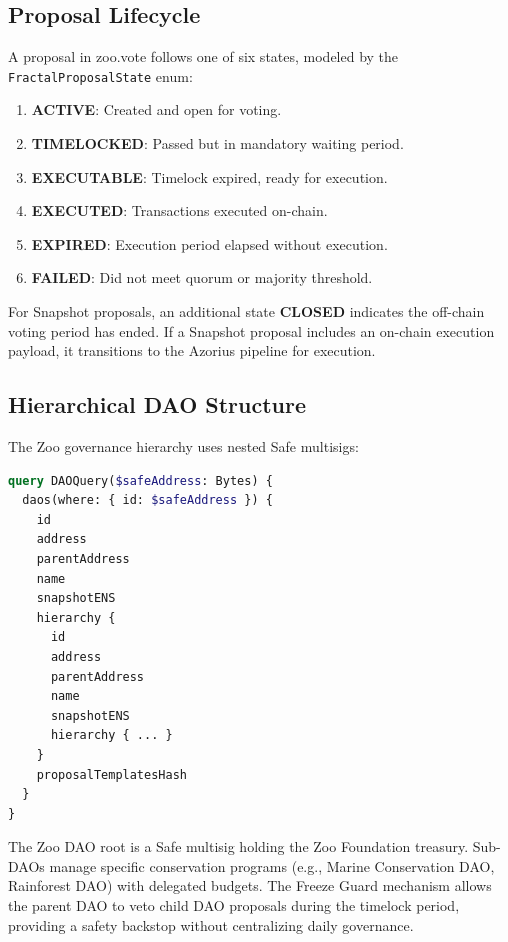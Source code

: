 \documentclass[11pt,letterpaper]{article}
\begin{document}
\subsection{Proposal Lifecycle}

A proposal in zoo.vote follows one of six states, modeled by the \texttt{FractalProposalState} enum:

\begin{enumerate}
    \item \textbf{ACTIVE}: Created and open for voting.
    \item \textbf{TIMELOCKED}: Passed but in mandatory waiting period.
    \item \textbf{EXECUTABLE}: Timelock expired, ready for execution.
    \item \textbf{EXECUTED}: Transactions executed on-chain.
    \item \textbf{EXPIRED}: Execution period elapsed without execution.
    \item \textbf{FAILED}: Did not meet quorum or majority threshold.
\end{enumerate}

For Snapshot proposals, an additional state \textbf{CLOSED} indicates the off-chain voting period has ended. If a Snapshot proposal includes an on-chain execution payload, it transitions to the Azorius pipeline for execution.

\subsection{Hierarchical DAO Structure}

The Zoo governance hierarchy uses nested Safe multisigs:

\begin{lstlisting}[language=GraphQL,caption=DAO hierarchy query (recursive)]
query DAOQuery($safeAddress: Bytes) {
  daos(where: { id: $safeAddress }) {
    id
    address
    parentAddress
    name
    snapshotENS
    hierarchy {
      id
      address
      parentAddress
      name
      snapshotENS
      hierarchy { ... }
    }
    proposalTemplatesHash
  }
}
\end{lstlisting}

The Zoo DAO root is a Safe multisig holding the Zoo Foundation treasury. Sub-DAOs manage specific conservation programs (e.g., Marine Conservation DAO, Rainforest DAO) with delegated budgets. The Freeze Guard mechanism allows the parent DAO to veto child DAO proposals during the timelock period, providing a safety backstop without centralizing daily governance.
\end{document}
